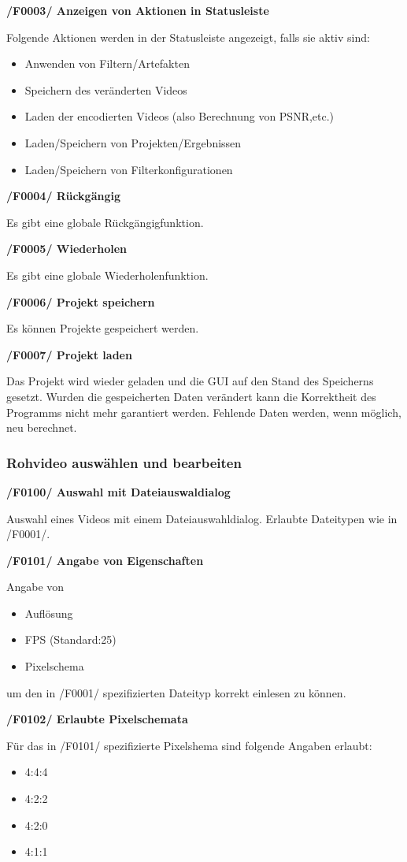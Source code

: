 \documentclass[parskip=full]{scrartcl}
\begin{document}
\textbf{/F0003/ Anzeigen von Aktionen in Statusleiste}

Folgende Aktionen werden in der Statusleiste angezeigt, falls sie aktiv sind:
\begin{itemize}
\item Anwenden von Filtern/Artefakten
\item Speichern des veränderten Videos
\item Laden der encodierten Videos (also Berechnung von PSNR,etc.)
\item Laden/Speichern von Projekten/Ergebnissen
\item Laden/Speichern von Filterkonfigurationen
\end{itemize}

\textbf{/F0004/ Rückgängig}

Es gibt eine globale Rückgängigfunktion.

\textbf{/F0005/ Wiederholen}

Es gibt eine globale Wiederholenfunktion.

\textbf{/F0006/ Projekt speichern}

Es können Projekte gespeichert werden.

\textbf{/F0007/ Projekt laden}

Das Projekt wird wieder geladen und die GUI auf den Stand des
Speicherns gesetzt. Wurden die gespeicherten Daten verändert kann die Korrektheit
des Programms nicht mehr garantiert werden. Fehlende Daten werden, wenn möglich, neu berechnet. 

\subsubsection{Rohvideo auswählen und bearbeiten}
\textbf{/F0100/ Auswahl mit Dateiauswaldialog}

Auswahl eines Videos mit einem Dateiauswahldialog. Erlaubte Dateitypen wie in /F0001/.

\textbf{/F0101/ Angabe von Eigenschaften}

Angabe von
\begin{itemize}
\item Auflösung
\item FPS (Standard:25)
\item Pixelschema
\end{itemize}
um den in /F0001/ spezifizierten Dateityp korrekt einlesen zu können.

\textbf{/F0102/ Erlaubte Pixelschemata}

Für das in /F0101/ spezifizierte Pixelshema sind folgende Angaben erlaubt:
\begin{itemize}
\item 4:4:4
\item 4:2:2
\item 4:2:0
\item 4:1:1
\end{itemize}
\end{document}
